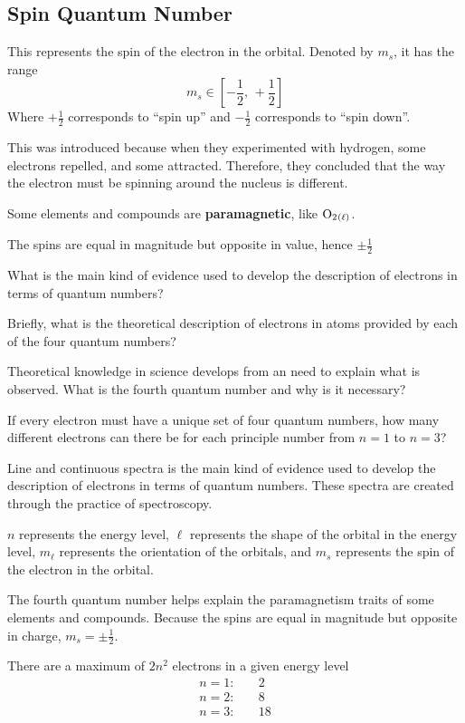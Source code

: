 \subsection{Spin Quantum Number}
This represents the spin of the electron in the orbital.
Denoted by $m_s$, it has the range
\[
    m_s\in[-\frac{1}{2},\,+\frac{1}{2}]
\]
Where $+\frac{1}{2}$ corresponds to ``spin up'' and $-\frac{1}{2}$ corresponds to ``spin down''. 
\begin{bulleted-list}
    \item This was introduced because when they experimented with hydrogen, some electrons repelled, and 
        some attracted. Therefore, they concluded that the way the electron must be spinning around the 
        nucleus is different.
    \item Some elements and compounds are \textbf{paramagnetic}, like $\ch{O2_{(\ell)}}$.
    \item The spins are equal in magnitude but opposite in value, hence $\pm\frac{1}{2}$
\end{bulleted-list}

\begin{problems}
    \item What is the main kind of evidence used to develop the description of electrons in terms
        of quantum numbers?
    \item Briefly, what is the theoretical description of electrons in atoms provided by each of
        the four quantum numbers?
    \item Theoretical knowledge in science develops from an need to explain what is observed. What
        is the fourth quantum number and why is it necessary?
    \item If every electron must have a unique set of four quantum numbers, how many different
        electrons can there be for each principle number from $n=1$ to $n=3$?
\end{problems}
\begin{solutions}
    \item Line and continuous spectra is the main kind of evidence used to develop the description
        of electrons in terms of quantum numbers. These spectra are created through the practice
        of spectroscopy.
    \item $n$ represents the energy level, $\ell$ represents the shape of the orbital in the energy level,
        $m_\ell$ represents the orientation of the orbitals, and $m_s$ represents the spin of
        the electron in the orbital.
    \item The fourth quantum number helps explain the paramagnetism traits of some elements and
        compounds. Because the spins are equal in magnitude but opposite in charge, $m_s=\pm\frac{1}{2}$.
    \item There are a maximum of $2n^2$ electrons in a given energy level
        \begin{align*}
            n=1:&\quad2\\
            n=2:&\quad8\\
            n=3:&\quad18
        \end{align*}
\end{solutions}
